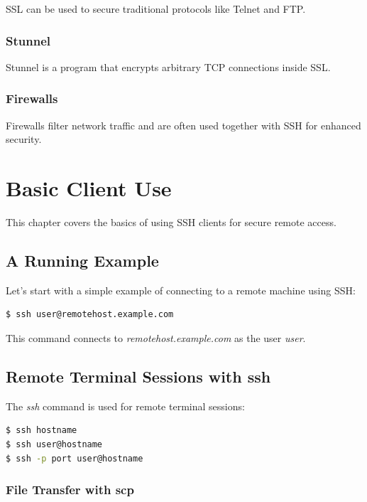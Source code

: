 \documentclass[12pt]{book}
\begin{document}
SSL can be used to secure traditional protocols like Telnet and FTP.

\subsection{Stunnel}

Stunnel is a program that encrypts arbitrary TCP connections inside SSL.

\subsection{Firewalls}

Firewalls filter network traffic and are often used together with SSH for enhanced security.

\chapter{Basic Client Use}

This chapter covers the basics of using SSH clients for secure remote access.

\section{A Running Example}

Let's start with a simple example of connecting to a remote machine using SSH:

\begin{lstlisting}[language=bash]
$ ssh user@remotehost.example.com
\end{lstlisting}

This command connects to \textit{remotehost.example.com} as the user \textit{user}.

\section{Remote Terminal Sessions with ssh}

The \textit{ssh} command is used for remote terminal sessions:

\begin{lstlisting}[language=bash]
$ ssh hostname
$ ssh user@hostname
$ ssh -p port user@hostname
\end{lstlisting}

\subsection{File Transfer with scp}
\end{document}
